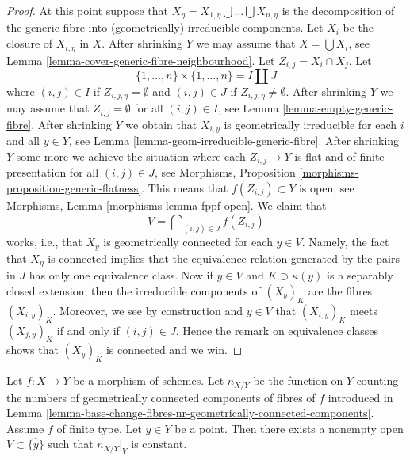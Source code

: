 \begin{proof}
\medskip\noindent
At this point suppose that
$X_\eta = X_{1, \eta} \bigcup \ldots \bigcup X_{n, \eta}$
is the decomposition of the generic fibre into
(geometrically) irreducible components.
Let $X_i$ be the closure of $X_{i, \eta}$ in $X$.
After shrinking $Y$ we may assume that
$X = \bigcup X_i$, see
Lemma \ref{lemma-cover-generic-fibre-neighbourhood}.
Let $Z_{i, j} = X_i \cap X_j$.
Let
$$
\{1, \ldots, n\} \times \{1, \ldots, n\} = I \amalg J
$$
where $(i, j) \in I$ if $Z_{i, j, \eta} = \emptyset$ and
$(i, j) \in J$ if $Z_{i, j, \eta} \not = \emptyset$.
After shrinking $Y$ we may assume that $Z_{i, j} = \emptyset$
for all $(i, j) \in I$, see
Lemma \ref{lemma-empty-generic-fibre}.
After shrinking $Y$ we obtain that $X_{i, y}$
is geometrically irreducible for each $i$ and all $y \in Y$, see
Lemma \ref{lemma-geom-irreducible-generic-fibre}.
After shrinking $Y$ some more we achieve the situation where
each $Z_{i, j} \to Y$ is flat and of finite presentation for
all $(i, j) \in J$, see
Morphisms, Proposition \ref{morphisms-proposition-generic-flatness}.
This means that $f(Z_{i, j}) \subset Y$ is open, see
Morphisms, Lemma \ref{morphisms-lemma-fppf-open}.
We claim that
$$
V  = \bigcap\nolimits_{(i, j) \in J} f(Z_{i, j})
$$
works, i.e., that $X_y$ is geometrically connected for each
$y \in V$. Namely, the fact that $X_\eta$ is connected implies that
the equivalence relation generated by the pairs in $J$ has only
one equivalence class. Now if $y \in V$ and $K \supset \kappa(y)$
is a separably closed extension, then the irreducible components
of $(X_y)_K$ are the fibres $(X_{i, y})_K$. Moreover, we see by
construction and $y \in V$ that $(X_{i, y})_K$ meets $(X_{j, y})_K$
if and only if $(i, j) \in J$. Hence the remark on equivalence classes
shows that $(X_y)_K$ is connected and we win.
\end{proof}

\begin{lemma}
\label{lemma-nr-geom-connected-components-good}
Let $f : X \to Y$ be a morphism of schemes. Let
$n_{X/Y}$ be the function on $Y$ counting the numbers of geometrically
connected components of fibres of $f$ introduced in
Lemma \ref{lemma-base-change-fibres-nr-geometrically-connected-components}.
Assume $f$ of finite type.
Let $y \in Y$ be a point. Then there exists a nonempty open
$V \subset \overline{\{y\}}$ such that $n_{X/Y}|_V$ is constant.
\end{lemma}

